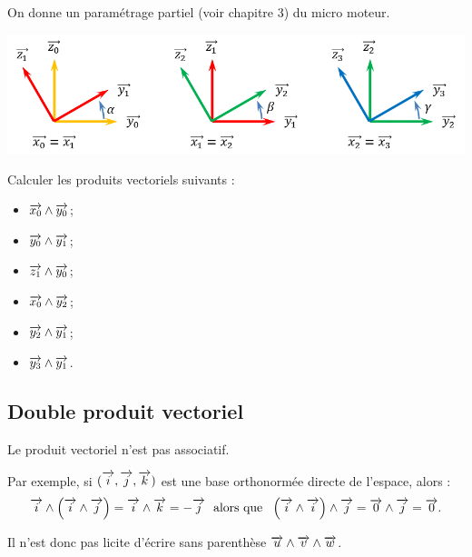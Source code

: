 \documentclass[10pt,oneside]{article}
\begin{document}
\begin{exemple}
On donne un paramétrage partiel (voir chapitre 3) du micro moteur. 
\begin{center}
\includegraphics[width=.8\textwidth]{png/parametrage}
\end{center}
Calculer les produits vectoriels suivants : 
\begin{itemize}
\item $\overrightarrow{x_0}\wedge \overrightarrow{y_0}$;
\item $\overrightarrow{y_0}\wedge \overrightarrow{y_1}$;
\item $\overrightarrow{z_1}\wedge \overrightarrow{y_0}$;
\item $\overrightarrow{x_0}\wedge \overrightarrow{y_2}$;
\item $\overrightarrow{y_2}\wedge \overrightarrow{y_1}$;
\item $\overrightarrow{y_3}\wedge \overrightarrow{y_1}$.
\end{itemize}
\end{exemple}

%


\subsection{Double produit vectoriel}

\begin{warn}
Le produit vectoriel n'est pas associatif.

Par exemple, si $(\overrightarrow{i}, \overrightarrow{j}, \overrightarrow{k})$ est une base orthonormée directe de l'espace, alors :
$$\vect{i}\wedge \left(\vect{i} \wedge \vect{j}\right)=\vect{i}\wedge \vect{k}=-\vect{j}\  \text{ alors que }\ \left(\vect{i}\wedge\vect{i}\right)\wedge\vect{j}=\vect{0}\wedge\vect{j}=\vect{0}.$$

Il n'est donc pas licite d'écrire sans parenthèse \og{}$\overrightarrow{u}\wedge\overrightarrow{v}\wedge\overrightarrow{w}$\fg{}.\\

\end{warn}
\end{document}
